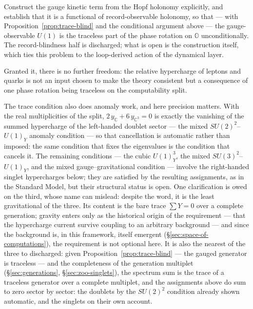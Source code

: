 \begin{openproblem}[Tracelessness of $U(1)_Y$]\label{op:traceless}
Construct the gauge kinetic term from the Hopf holonomy explicitly, and establish that it is a
functional of record-observable holonomy, so that --- with Proposition~\ref{prop:trace-blind} and
the conditional argument above --- the gauge-observable $U(1)$ is the traceless part of the phase
rotation on $\mathbb{O}$ unconditionally. The record-blindness half is discharged; what is open is
the construction itself, which ties this problem to the loop-derived action of the dynamical layer.
\end{openproblem}

Granted it, there is no further freedom: the relative hypercharge of leptons and quarks is not an
input chosen to make the theory consistent but a consequence of one phase rotation being traceless
on the computability split.

The trace condition also does anomaly work, and here precision matters. With the real
multiplicities of the split, $2\,y_{\mathbb{C}} + 6\,y_{\mathbb{C}^3} = 0$ is exactly the vanishing
of the summed hypercharge of the left-handed doublet sector --- the mixed $SU(2)^2$--$U(1)_Y$
anomaly condition --- so that cancellation is automatic rather than imposed: the same condition
that fixes the eigenvalues is the condition that cancels it. The remaining conditions --- the cubic
$U(1)_Y^3$, the mixed $SU(3)^2$--$U(1)_Y$, and the mixed gauge--gravitational condition --- involve
the right-handed singlet hypercharges below; they are satisfied by the resulting assignments, as in
the Standard Model, but their structural status is open. One clarification is owed on the third,
whose name can mislead: despite the word, it is the least gravitational of the three. Its content
is the bare trace $\sum Y = 0$ over a complete generation; gravity enters only as the historical
origin of the requirement --- that the hypercharge current survive coupling to an arbitrary
background --- and since the background is, in this framework, itself emergent
(\S\ref{sec:space-of-computations}), the requirement is not optional here. It is also the nearest
of the three to discharged: given Proposition~\ref{prop:trace-blind} --- the gauged generator is
traceless --- and the completeness of the generation multiplet (\S\ref{sec:generations},
\S\ref{sec:zoo-singlets}), the spectrum sum is the trace of a traceless generator over a complete
multiplet, and the assignments above do sum to zero sector by sector: the doublets by the
$SU(2)^{2}$ condition already shown automatic, and the singlets on their own account.

